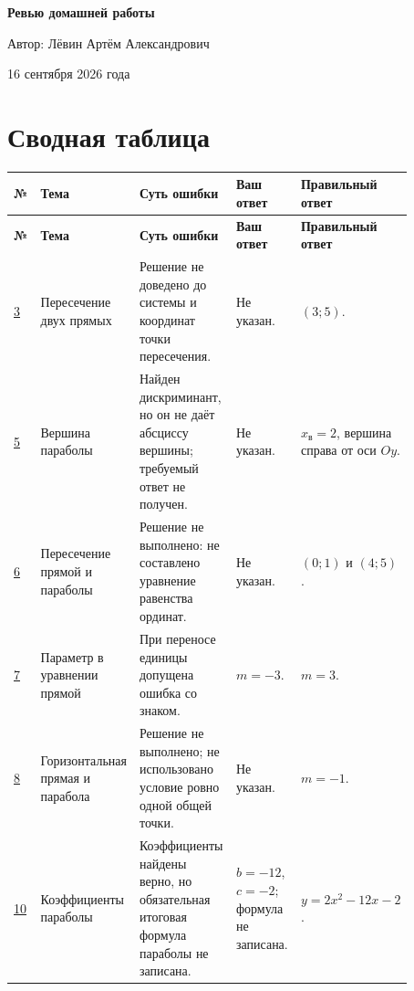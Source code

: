 \documentclass[12pt,a4paper]{article}
\begin{document}
\hypersetup{pageanchor=false}

\begin{titlepage}
\centering
\vspace*{0.24\textheight}
{\LARGE\bfseries Ревью домашней работы\par}
\vspace{1.7cm}
{\large Автор: Лёвин Артём Александрович\par}
\vspace{0.8cm}
{\large 16 сентября 2026 года\par}
\vfill
{}
\end{titlepage}
\hypersetup{pageanchor=true}

\newpage
\section*{Сводная таблица}
\small
\setlength{\tabcolsep}{3pt}
\begin{longtable}{@{}>{\centering\arraybackslash}p{0.07\linewidth}p{0.17\linewidth}p{0.26\linewidth}p{0.17\linewidth}p{0.20\linewidth}@{}}
\toprule
\textbf{№} & \textbf{Тема} & \textbf{Суть ошибки} & \textbf{Ваш ответ} & \textbf{Правильный ответ} \\
\midrule
\endfirsthead
\toprule
\textbf{№} & \textbf{Тема} & \textbf{Суть ошибки} & \textbf{Ваш ответ} & \textbf{Правильный ответ} \\
\midrule
\endhead
\hyperref[task:3]{3} & Пересечение двух прямых & Решение не доведено до системы и координат точки пересечения. & Не указан. & $(3;5)$. \\
\addlinespace
\hyperref[task:5]{5} & Вершина параболы & Найден дискриминант, но он не даёт абсциссу вершины; требуемый ответ не получен. & Не указан. & $x_{\text{в}}=2$, вершина справа от оси $Oy$. \\
\addlinespace
\hyperref[task:6]{6} & Пересечение прямой и параболы & Решение не выполнено: не составлено уравнение равенства ординат. & Не указан. & $(0;1)$ и $(4;5)$. \\
\addlinespace
\hyperref[task:7]{7} & Параметр в уравнении прямой & При переносе единицы допущена ошибка со знаком. & $m=-3$. & $m=3$. \\
\addlinespace
\hyperref[task:8]{8} & Горизонтальная прямая и парабола & Решение не выполнено; не использовано условие ровно одной общей точки. & Не указан. & $m=-1$. \\
\addlinespace
\hyperref[task:10]{10} & Коэффициенты параболы & Коэффициенты найдены верно, но обязательная итоговая формула параболы не записана. & $b=-12$, $c=-2$; формула не записана. & $y=2x^2-12x-2$. \\
\bottomrule
\end{longtable}
\normalsize
\end{document}
